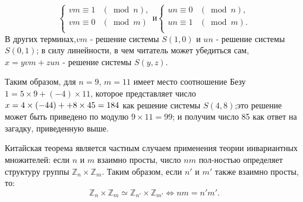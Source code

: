 \documentclass{mai_book}
\begin{document}
$$ \left\{
\begin{array}{rcl}
vm \equiv 1&(\bmod{n}),\\
vm \equiv 0&(\bmod{m})\\
\end{array}
\right. и 
\left\{
\begin{array}{rcl}
un \equiv 0&(\bmod{n}),\\
un \equiv 1&(\bmod{m}).\\
\end{array}
\right.$$
В других терминах,$vm$ - решение системы $S(1,0)$ и $un$ - решение \linebreak системы $S(0,1)$; в силу линейности, в чем читатель может убедиться \linebreak сам, $x=yvm+zun$ - решение системы $S(y,z)$.
  
  Таким образом, для $n=9$, $m=11$ имеет место соотношение Безу \linebreak $1=5\times 9+(-4)\times 11$, которое представляет число $x=4\times (-44)+ \linebreak +8 \times 45=184$ как решение системы $S(4,8)$;это решение может быть \linebreak приведено по модулю $9 \times 11 = 99$; и получим число 85 как ответ на \linebreak загадку, приведенную выше.
  
  Китайская теорема является частным случаем применения теории \linebreak инвариантных множителей: если $n$ и $m$ взаимно просты, число $nm$ пол-\linebreak ностью определяет структуру группы $\mathbb{Z}_n \times \mathbb{Z}_m$. Таким образом, если $n'$ \linebreak и $m'$ также взаимно просты, то:
$$\mathbb{Z}_n \times \mathbb{Z}_m \simeq \mathbb{Z}_{n'} \times \mathbb{Z}_{m'} \Longleftrightarrow nm=n'm'.$$
  
\end{document}
